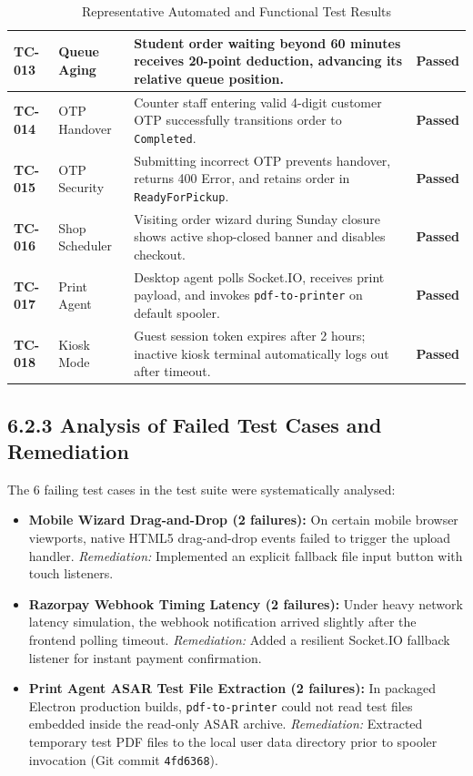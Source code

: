 \documentclass[12pt,a4paper,oneside]{report}
\begin{document}
\begin{table}[H]
\begin{tabularx}{\textwidth}{|p{0.55in}|p{1.2in}|X|p{0.6in}|}
\textbf{TC-013} & Queue Aging & Student order waiting beyond 60 minutes receives 20-point deduction, advancing its relative queue position. & \textbf{Passed} \\ \hline
\textbf{TC-014} & OTP Handover & Counter staff entering valid 4-digit customer OTP successfully transitions order to \texttt{Completed}. & \textbf{Passed} \\ \hline
\textbf{TC-015} & OTP Security & Submitting incorrect OTP prevents handover, returns 400 Error, and retains order in \texttt{ReadyForPickup}. & \textbf{Passed} \\ \hline
\textbf{TC-016} & Shop Scheduler & Visiting order wizard during Sunday closure shows active shop-closed banner and disables checkout. & \textbf{Passed} \\ \hline
\textbf{TC-017} & Print Agent & Desktop agent polls Socket.IO, receives print payload, and invokes \texttt{pdf-to-printer} on default spooler. & \textbf{Passed} \\ \hline
\textbf{TC-018} & Kiosk Mode & Guest session token expires after 2 hours; inactive kiosk terminal automatically logs out after timeout. & \textbf{Passed} \\ \hline
\end{tabularx}
\caption{Representative Automated and Functional Test Results}
\label{tab:test_cases}
\end{table}

\subsection{6.2.3 Analysis of Failed Test Cases and Remediation}
The 6 failing test cases in the test suite were systematically analysed:
\begin{itemize}[leftmargin=0.35in, itemsep=2pt]
  \item \textbf{Mobile Wizard Drag-and-Drop (2 failures):} On certain mobile browser viewports, native HTML5 drag-and-drop events failed to trigger the upload handler. \textit{Remediation:} Implemented an explicit fallback file input button with touch listeners.
  \item \textbf{Razorpay Webhook Timing Latency (2 failures):} Under heavy network latency simulation, the webhook notification arrived slightly after the frontend polling timeout. \textit{Remediation:} Added a resilient Socket.IO fallback listener for instant payment confirmation.
  \item \textbf{Print Agent ASAR Test File Extraction (2 failures):} In packaged Electron production builds, \texttt{pdf-to-printer} could not read test files embedded inside the read-only ASAR archive. \textit{Remediation:} Extracted temporary test PDF files to the local user data directory prior to spooler invocation (Git commit \texttt{4fd6368}).
\end{itemize}
\end{document}
